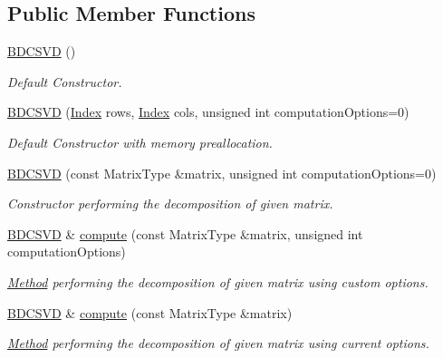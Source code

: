 \subsection*{Public Member Functions}
\begin{DoxyCompactItemize}
\item 
\mbox{\hyperlink{class_eigen_1_1_b_d_c_s_v_d_a39514816d38f9c418cf3f3514b511c2c}{B\+D\+C\+S\+VD}} ()
\begin{DoxyCompactList}\small\item\em Default Constructor. \end{DoxyCompactList}\item 
\mbox{\hyperlink{class_eigen_1_1_b_d_c_s_v_d_a3e1fa48b3d042b7daf7392724a68bb60}{B\+D\+C\+S\+VD}} (\mbox{\hyperlink{class_eigen_1_1_s_v_d_base_a6229a37997eca1072b52cca5ee7a2bec}{Index}} rows, \mbox{\hyperlink{class_eigen_1_1_s_v_d_base_a6229a37997eca1072b52cca5ee7a2bec}{Index}} cols, unsigned int computation\+Options=0)
\begin{DoxyCompactList}\small\item\em Default Constructor with memory preallocation. \end{DoxyCompactList}\item 
\mbox{\hyperlink{class_eigen_1_1_b_d_c_s_v_d_a302746d9c534cd513c1df87c7ae4850d}{B\+D\+C\+S\+VD}} (const Matrix\+Type \&matrix, unsigned int computation\+Options=0)
\begin{DoxyCompactList}\small\item\em Constructor performing the decomposition of given matrix. \end{DoxyCompactList}\item 
\mbox{\hyperlink{class_eigen_1_1_b_d_c_s_v_d}{B\+D\+C\+S\+VD}} \& \mbox{\hyperlink{class_eigen_1_1_b_d_c_s_v_d_a52e3c627775010775c64d16a00cdb770}{compute}} (const Matrix\+Type \&matrix, unsigned int computation\+Options)
\begin{DoxyCompactList}\small\item\em \mbox{\hyperlink{struct_method}{Method}} performing the decomposition of given matrix using custom options. \end{DoxyCompactList}\item 
\mbox{\hyperlink{class_eigen_1_1_b_d_c_s_v_d}{B\+D\+C\+S\+VD}} \& \mbox{\hyperlink{class_eigen_1_1_b_d_c_s_v_d_acf27f41ed044d74ea8e8cbaf17ffdb04}{compute}} (const Matrix\+Type \&matrix)
\begin{DoxyCompactList}\small\item\em \mbox{\hyperlink{struct_method}{Method}} performing the decomposition of given matrix using current options. \end{DoxyCompactList}\item 

\end{DoxyCompactItemize}

